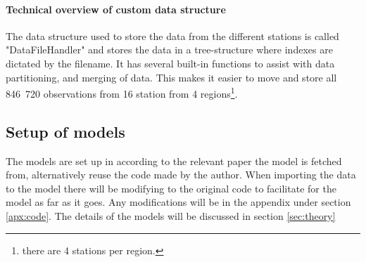 \paragraph{Technical overview of custom data structure}

The data structure used to store the data from the different stations is called "DataFileHandler" and stores the data in a tree-structure where indexes are dictated by the filename. It has several built-in functions to assist with data partitioning, and merging of data. This makes it easier to move and store all 846 720 observations from 16 station from 4 regions\footnote{there are 4 stations per region.}. 

\subsection{Setup of models}

The models are set up in according to the relevant paper the model is fetched from, alternatively reuse the code made by the author. When importing the data to the model there will be modifying to the original code to facilitate for the model as far as it goes. Any modifications will be in the appendix under section \ref{apx:code}. The details of the models will be discussed in section \ref{sec:theory}